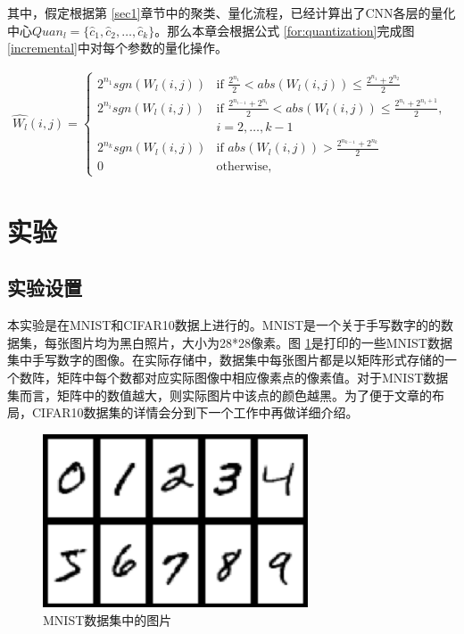 \documentclass[ pdftex, oneside, master]{NJUthesis}
\begin{document}
其中，假定根据第 \ref{sec1}章节中的聚类、量化流程，已经计算出了CNN各层的量化中心$Quan_l=\{\hat c_1, \hat c_2, \dots, \hat  c_k\}$。那么本章会根据公式 \ref{for:quantization}完成图 \ref{incremental}中对每个参数的量化操作。

\begin{eqnarray}
\hat{W_l}(i,j)=\begin{cases}
2^{n_1}sgn(W_l(i,j))&\text{if $\frac{2^{n_1}}{2}<abs(W_l(i,j))\leq\frac{2^{n_{1}}+2^{n_2}}{2}$}\\
2^{n_i}sgn(W_l(i,j))&
\text{if $\frac{2^{n_{i-1}}+2^{n_i}}{2}< abs(W_l(i,j))\leq \frac{2^{n_{i}}+2^{n_i+1}}{2},$}\\
&\text{$i=2,\ldots,k-1$}\\
2^{n_k}sgn(W_l(i,j))&\text{if $abs(W_l(i,j))>\frac{2^{n_{k-1}}+2^{n_k}}{2}$}\\
0&\text{otherwise},
\label{for:quantization}
\end{cases}\
\end{eqnarray}

\section{实验}

\subsection{实验设置}

本实验是在MNIST和CIFAR10数据上进行的。MNIST是一个关于手写数字的的数据集，每张图片均为黑白照片，大小为28*28像素。图 \ref{fig:mnist}是打印的一些MNIST数据集中手写数字的图像。在实际存储中，数据集中每张图片都是以矩阵形式存储的一个数阵，矩阵中每个数都对应实际图像中相应像素点的像素值。对于MNIST数据集而言，矩阵中的数值越大，则实际图片中该点的颜色越黑。为了便于文章的布局，CIFAR10数据集的详情会分到下一个工作中再做详细介绍。

\begin{figure}
\centering
\includegraphics[width=0.7\textwidth]{mnist.png}
\caption{MNIST数据集中的图片}
\label{fig:mnist}
\end{figure}
\end{document}
